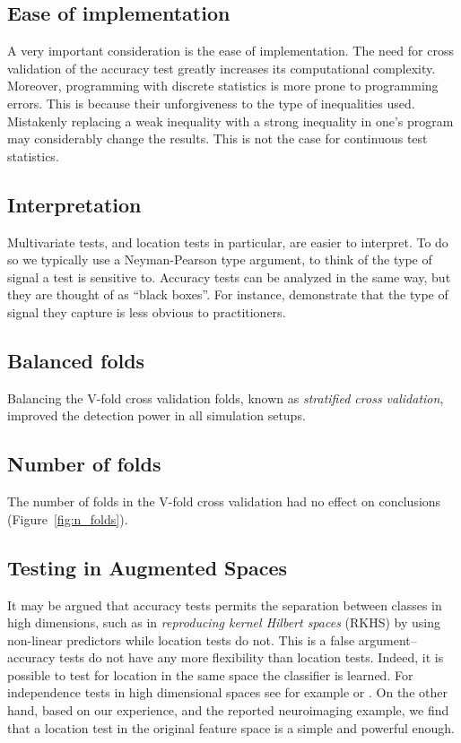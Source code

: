 \documentclass[12pt,a4paper]{article}
\begin{document}
\subsection{Ease of implementation}
A very important consideration is the ease of implementation. 
The need for cross validation of the accuracy test greatly increases its computational complexity. 
Moreover, programming with discrete statistics is more prone to programming errors. 
This is because their unforgiveness to the type of inequalities used. 
Mistakenly replacing a weak inequality with a strong inequality in one's program may considerably change the results. 
This is not the case for continuous test statistics. 



\subsection{Interpretation}
Multivariate tests, and location tests in particular, are easier to interpret. 
To do so we typically use a Neyman-Pearson type argument, to think of the type of signal a test is sensitive to. 
Accuracy tests can be analyzed in the same way, but they are thought of as ``black boxes''. 
For instance, \citet{gilron2017s} demonstrate that the type of signal they capture is less obvious to practitioners.  



\subsection{Balanced folds}
Balancing the V-fold cross validation folds, known as \emph{stratified cross validation}, improved the detection power in all simulation setups. 


\subsection{Number of folds}
The number of folds in the V-fold cross validation had no effect on conclusions (Figure~\ref{fig:n_folds}).


\subsection{Testing in Augmented Spaces}
It may be argued that accuracy tests permits the separation between classes in high dimensions, such as in \emph{reproducing kernel Hilbert spaces} (RKHS) by using non-linear predictors while location tests do not. 
This is a false argument-- accuracy tests do not have any more flexibility than location tests. 
Indeed, it is possible to test for location in the same space the classifier is learned. 
For independence tests in high dimensional spaces see for example \cite{szekely_brownian_2009} or \citet{gretton_kernel_2012-1}.
On the other hand, based on our experience, and the reported neuroimaging example, we find that a location test in the original feature space is a simple and powerful enough.
\end{document}
